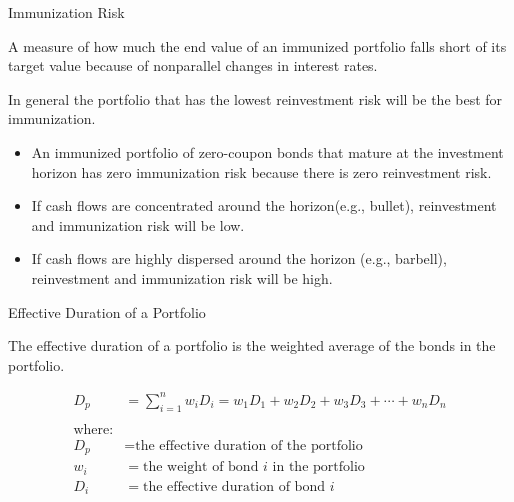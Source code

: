 \documentclass[../custom]{flashcards}
\begin{document}
\begin{flashcard}{Immunization Risk}
    \begin{flushleft}
        A measure of how much the end value of an immunized portfolio falls short of its target value because of nonparallel changes in interest rates.\newline

        In general the portfolio that has the lowest reinvestment risk will be the best for immunization.
        \begin{itemize}
            \item An immunized portfolio of zero-coupon bonds that mature at the investment horizon has zero immunization risk because there is zero reinvestment risk.
            \item If cash flows are concentrated around the horizon(e.g., bullet), reinvestment and immunization risk will be low.
            \item If cash flows are highly dispersed around the horizon (e.g., barbell), reinvestment and immunization risk will be high.
        \end{itemize}
    \end{flushleft}
\end{flashcard}

\begin{flashcard}{Effective Duration of a Portfolio}
    \begin{flushleft}
        The effective duration of a portfolio is the weighted average of the bonds in the portfolio.
    \end{flushleft}
    \begin{align*}
        D_p &= \sum_{i=1}^n w_iD_i = w_1D_1 + w_2D_2 + w_3D_3 + \cdots + w_nD_n\\
        \\
        \text{where:}\\
        D_p &= \text{the effective duration of the portfolio}\\
        w_i &= \text{the weight of bond $i$ in the portfolio}\\
        D_i &= \text{the effective duration of bond $i$}\\
    \end{align*}
\end{flashcard}
\end{document}
